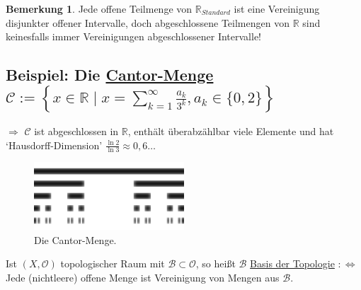 \documentclass[a4paper,11pt,notitlepage]{report}
\theoremstyle{definition}
\newtheorem{remark}{Bemerkung}[chapter]
\newcommand{\R}{{\ensuremath{\mathbb{R}}}}
\newcommand{\OO}{{\ensuremath{\mathcal{O}}}}
\newenvironment{bsp}[1]
{
\setlength{\fboxsep}{10pt}
\subsection*{Beispiel: #1}
\begin{upshape}
}
{
\end{upshape}
}
\newenvironment{definition}[1]{
	\begin{definitions}
	\marginnote{\emph{#1}}
}{\end{definitions}}
\begin{document}
\begin{remark}
	Jede offene Teilmenge von $\R_{Standard}$ ist eine Vereinigung disjunkter offener Intervalle, doch abgeschlossene Teilmengen von $\R$ sind keinesfalls immer Vereinigungen abgeschlossener Intervalle!
\end{remark}

\begin{bsp}{Die \underline{Cantor-Menge} $\mathcal{C}:= \left \{ x \in \R \mid x = \sum\limits_{k=1}^{\infty}{\frac{a_k}{3^k}}, a_k \in \{0,2\} \right \}$}
	$\Rightarrow$ $\mathcal{C}$ ist abgeschlossen in $\R$, enthält überabzählbar viele Elemente und hat `Hausdorff-Dimension' $\frac{\ln 2}{\ln 3} \approx 0,6 \ldots$
\end{bsp}

\begin{figure}[h]
\centering
\includegraphics[width=0.5\textwidth]{images/Cantormenge_5te_Iteration.png}
\caption{Die Cantor-Menge.}
\end{figure}

\begin{definition}{Basis}
	Ist $(X, \OO)$ topologischer Raum mit $\mathcal{B} \subset \OO$, 
	\newline
	so heißt $\mathcal{B}$ \underline{Basis der Topologie} $:\Leftrightarrow$ Jede (nichtleere) offene Menge ist Vereinigung von Mengen aus $\mathcal{B}$.
\end{definition}
\end{document}
